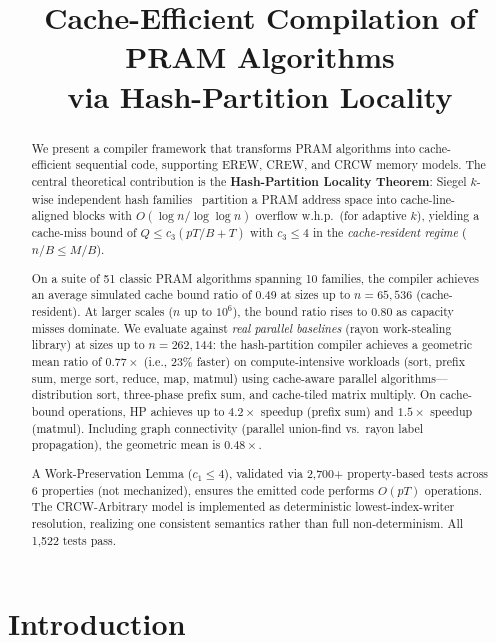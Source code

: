 \documentclass[11pt]{article}
\title{Cache-Efficient Compilation of PRAM Algorithms\\
via Hash-Partition Locality}
\date{}
\begin{document}
\maketitle

\begin{abstract}
We present a compiler framework that transforms PRAM algorithms into
cache-efficient sequential code, supporting EREW, CREW, and CRCW memory
models.  The central theoretical contribution is the
\textbf{Hash-Partition Locality Theorem}: Siegel $k$-wise independent
hash families~\cite{siegel2004universal} partition a PRAM address space
into cache-line-aligned blocks with $O(\log n / \log\log n)$ overflow
w.h.p.\ (for adaptive $k$), yielding a cache-miss bound of
$Q \le c_3(pT/B + T)$ with $c_3 \le 4$ in the \emph{cache-resident
regime} ($n/B \le M/B$).

On a suite of 51 classic PRAM algorithms spanning 10 families, the
compiler achieves an average simulated cache bound ratio of 0.49 at
sizes up to $n = 65{,}536$ (cache-resident).  At larger scales
($n$ up to $10^6$), the bound ratio rises to 0.80 as capacity misses
dominate.  We evaluate against \emph{real parallel baselines} (rayon
work-stealing library) at sizes up to $n = 262{,}144$: the
hash-partition compiler achieves a geometric mean ratio of
$0.77\times$ (i.e., 23\% faster) on compute-intensive workloads
(sort, prefix sum, merge sort, reduce, map, matmul) using
cache-aware parallel algorithms---distribution sort, three-phase
prefix sum, and cache-tiled matrix multiply.  On cache-bound
operations, HP achieves up to $4.2\times$ speedup (prefix sum) and
$1.5\times$ speedup (matmul).  Including graph connectivity
(parallel union-find vs.\ rayon label propagation), the geometric
mean is $0.48\times$.

A Work-Preservation Lemma ($c_1 \le 4$), validated via 2,700+
property-based tests across 6 properties (not mechanized), ensures the
emitted code performs $O(pT)$ operations.  The CRCW-Arbitrary model is
implemented as deterministic lowest-index-writer resolution, realizing
one consistent semantics rather than full non-determinism.  All 1,522
tests pass.
\end{abstract}

\section{Introduction}
\label{sec:intro}
\end{document}
